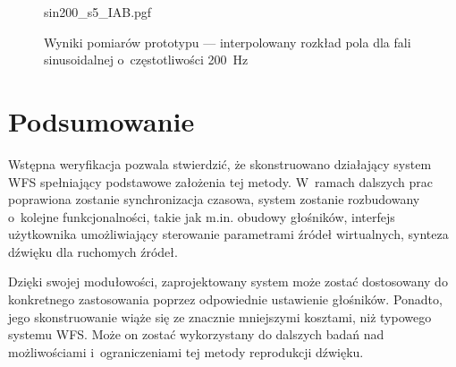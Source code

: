 \documentclass[10pt, a4paper]{article}
\let\Oldsection\section
\renewcommand{\section}{\FloatBarrier\Oldsection}
\begin{document}
\begin{figure}[!tbh]
    \centering
    {sin200_s5_IAB.pgf}
    \caption{Wyniki pomiarów prototypu --- interpolowany rozkład pola dla fali sinusoidalnej o~częstotliwości \SI{200}{\hertz}}
  \label{r:pomiar_kb}
\end{figure}

\section{Podsumowanie}

Wstępna weryfikacja pozwala stwierdzić, że
skonstruowano działający system WFS spełniający podstawowe założenia tej metody.
W~ramach dalszych prac poprawiona zostanie synchronizacja czasowa,
system zostanie rozbudowany o~kolejne funkcjonalności,
takie jak m.in. obudowy głośników, interfejs użytkownika umożliwiający sterowanie 
parametrami źródeł wirtualnych, synteza dźwięku dla ruchomych źródeł.

Dzięki swojej modułowości, zaprojektowany system może zostać dostosowany do 
konkretnego zastosowania poprzez odpowiednie ustawienie głośników. Ponadto,
jego skonstruowanie wiąże się ze znacznie mniejszymi kosztami, niż typowego
systemu WFS. Może on zostać wykorzystany do dalszych badań nad możliwościami 
i~ograniczeniami tej metody reprodukcji dźwięku.


\printbibliography
\end{document}
